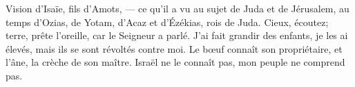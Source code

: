 Vision d’Isaïe, fils d’Amots,
	--- ce qu’il a vu au sujet de Juda et de Jérusalem,
	au temps d’Ozias, de Yotam, d’Acaz et d’Ézékias, rois de Juda.
Cieux, écoutez; terre, prête l’oreille,
	car le Seigneur a parlé.
J’ai fait grandir des enfants, je les ai élevés, mais ils se sont révoltés contre moi.
Le bœuf connaît son propriétaire, et l’âne, la crèche de son maître.
	Israël ne le connaît pas, mon peuple ne comprend pas.
